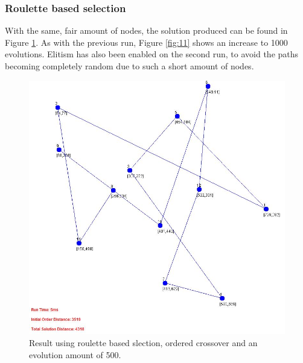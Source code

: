 \documentclass[article]{IEEEtran}
\begin{document}
\subsubsection{Roulette based selection}
With the same, fair amount of nodes, the solution produced can be found in Figure \ref{fig:10}. As with the previous run, Figure \ref{fig:11} shows an increase to 1000 evolutions. Elitism has also been enabled on the second run, to avoid the paths becoming completely random due to such a short amount of nodes.
\begin{figure}[H]
\centering
  \includegraphics[width=.9\linewidth]{images/ordered_routlette_015_500_false}
  \caption{Result using roulette based slection, ordered crossover and an evolution amount of 500.}
  \label{fig:10}
\end{figure}
\end{document}
